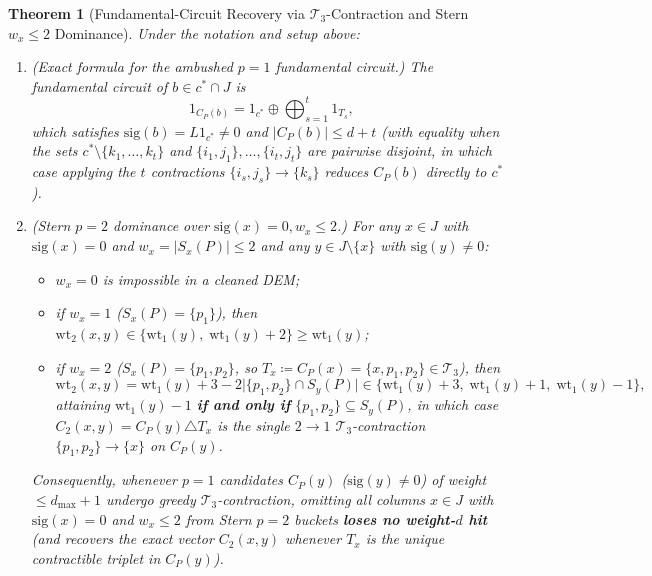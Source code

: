 \documentclass[12pt]{article}
\newtheorem{theorem}{Theorem}
\theoremstyle{definition}
\newcommand{\Tc}{\mathcal{T}_3}
\begin{document}
\begin{theorem}[Fundamental-Circuit Recovery via $\Tc$-Contraction and Stern $w_x \le 2$
  Dominance]\label{thm:contraction_dominance}
Under the notation and setup above:
\begin{enumerate}[label=(\alph*)]
  \item \emph{(Exact formula for the ambushed $p = 1$ fundamental circuit.)} The fundamental circuit of $b \in c^*
    \cap J$ is
    \begin{equation}\label{eq:ambushed_circuit}
      1_{C_P(b)} = 1_{c^*} \oplus \bigoplus_{s=1}^t 1_{T_s},
    \end{equation}
    which satisfies $\mathrm{sig}(b) = L 1_{c^*} \neq 0$ and $|C_P(b)| \le d + t$ (with equality when the sets
    $c^* \setminus \{k_1, \dots, k_t\}$ and $\{i_1, j_1\}, \dots, \{i_t, j_t\}$ are pairwise disjoint, in which case
    applying the $t$ contractions $\{i_s, j_s\} \to \{k_s\}$ reduces $C_P(b)$ directly to $c^*$).
  \item \emph{(Stern $p = 2$ dominance over $\mathrm{sig}(x) = 0, w_x \le 2$.)} For any $x \in J$ with
    $\mathrm{sig}(x) = 0$ and $w_x = |S_x(P)| \le 2$ and any $y \in J \setminus \{x\}$ with $\mathrm{sig}(y) \neq
    0$:
    \begin{itemize}
      \item $w_x = 0$ is impossible in a cleaned DEM;
      \item if $w_x = 1$ ($S_x(P) = \{p_1\}$), then $\mathrm{wt}_2(x, y) \in \{\mathrm{wt}_1(y),\; \mathrm{wt}_1(y)
        + 2\} \ge \mathrm{wt}_1(y)$;
      \item if $w_x = 2$ ($S_x(P) = \{p_1, p_2\}$, so $T_x \coloneqq C_P(x) = \{x, p_1, p_2\} \in \Tc$), then
        \begin{equation}\label{eq:w2_cases}
          \mathrm{wt}_2(x, y) = \mathrm{wt}_1(y) + 3 - 2\bigl|\{p_1, p_2\} \cap S_y(P)\bigr|
          \in \{\mathrm{wt}_1(y) + 3,\; \mathrm{wt}_1(y) + 1,\; \mathrm{wt}_1(y) - 1\},
        \end{equation}
        attaining $\mathrm{wt}_1(y) - 1$ \textbf{if and only if} $\{p_1, p_2\} \subseteq S_y(P)$, in which case
        $C_2(x, y) = C_P(y) \triangle T_x$ is the single $2 \to 1$ $\Tc$-contraction $\{p_1, p_2\} \to \{x\}$ on
        $C_P(y)$.
    \end{itemize}
    Consequently, whenever $p = 1$ candidates $C_P(y)$ ($\mathrm{sig}(y) \neq 0$) of weight $\le d_{\max} + 1$
    undergo greedy $\Tc$-contraction, omitting all columns $x \in J$ with $\mathrm{sig}(x) = 0$ and $w_x \le 2$
    from Stern $p = 2$ buckets \textbf{loses no weight-$d$ hit} (and recovers the exact vector $C_2(x, y)$ whenever
    $T_x$ is the unique contractible triplet in $C_P(y)$).
\end{enumerate}
\end{theorem}
\end{document}
